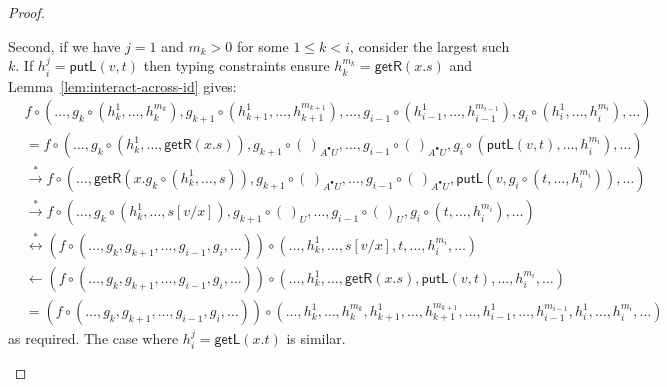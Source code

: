 \documentclass[twoside,11pt,final]{entics}
\newcommand{\getl}{\mathsf{getL}}
\newcommand{\getr}{\mathsf{getR}}
\newcommand{\putl}{\mathsf{putL}}
\newcommand{\from}{\leftarrow}
\newcommand{\seq}{,\!\ldots\!,}
\begin{document}
\begin{proof}
\begin{itemize}
  Second, if we have $j=1$ and $m_k > 0$ for some $1 \leq k < i$, consider the largest such $k$. If $h_i^j = \putl(v,t)$ then typing constraints ensure $h_k^{m_k} = \getr(x.s)$ and Lemma~\ref{lem:interact-across-id} gives:
  \begin{align*}
    & f \circ (\ldots \!, g_k \circ (h_k^1 \seq h_k^{m_k}),g_{k+1} \circ (h_{k+1}^{1}\seq h_{k+1}^{m_{k+1}}) \seq g_{i-1} \circ (h_{i-1}^1\seq h_{i-1}^{m_{i-1}}),g_i \circ (h_i^1 \seq h_i^{m_i}) ,\! \ldots)
    \\&= f \circ (\ldots\!, g_k \circ (h_k^1 \seq \getr(x.s)),g_{k+1} \circ (\,)_{A^\bullet U} \seq g_{i-1} \circ (\,)_{A^\bullet U} ,g_i \circ (\putl(v,t) \seq h_i^{m_i}),\!\ldots)
    \\& \stackrel{*}{\to} f \circ (\ldots\!, \getr(x.g_k \circ (h_k^1 \seq s)),g_{k+1} \circ (\,)_{A^\bullet U} \seq g_{i-1} \circ (\,)_{A^\bullet U} ,\putl(v,g_i \circ (t \seq h_i^{m_i})),\!\ldots)
    \\& \stackrel{*}{\to} f \circ (\ldots\!, g_k \circ (h_k^1 \seq s[v/x]),g_{k+1} \circ (\,)_{U} \seq g_{i-1} \circ (\,)_{U} , g_i \circ (t \seq h_i^{m_i}),\!\ldots)
    \\& \stackrel{*}{\leftrightarrow} (f \circ (\ldots \!, g_k,g_{k+1}\seq g_{i-1},g_i ,\!\ldots)) \circ (\ldots\!, h_k^1 \seq s[v/x],t \seq h_i^{m_i} ,\!\ldots)
    \\& \from  (f \circ (\ldots \!, g_k,g_{k+1}\seq g_{i-1},g_i ,\!\ldots)) \circ (\ldots\!, h_k^1 \seq \getr(x.s), \putl(v,t) \seq h_i^{m_i} ,\!\ldots)
    \\&= (f \circ (\ldots \!, g_k,g_{k+1}\seq g_{i-1},g_i ,\!\ldots)) \circ (\ldots \!, h_k^1 \seq h_k^{m_k},h_{k+1}^1 \seq h_{k+1}^{m_{k+1}}\seq h_{i-1}^1 \seq h_{i-1}^{m_{i-1}},h_i^1 \seq h_i^{m_i} ,\!\ldots)
  \end{align*}
  as required. The case where $h_i^j = \getl(x.t)$ is similar. 
  

\end{itemize}
\end{proof}
\end{document}
